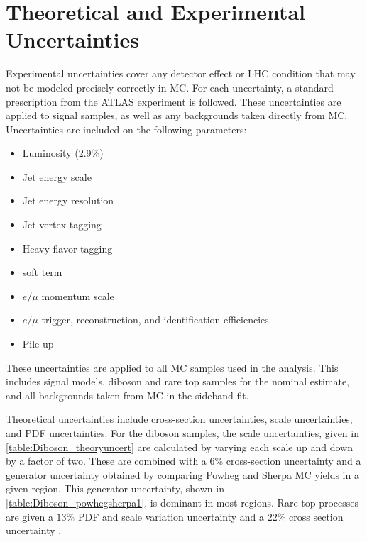 
\section{Theoretical and Experimental Uncertainties}

Experimental uncertainties cover any detector effect or \ac{LHC} condition that may not be modeled precisely correctly in \ac{MC}. For each uncertainty, a standard prescription from the \ac{ATLAS} experiment is followed. These uncertainties are applied to signal samples, as well as any backgrounds taken directly from \ac{MC}. Uncertainties are included on the following parameters:  
\begin{itemize}
\item Luminosity (2.9\%) \cite{2011lumi,2012lumi}
\item Jet energy scale \cite{ATL-PHYS-PUB-2015-015}
\item Jet energy resolution \cite{ATL-PHYS-PUB-2015-015}
\item Jet vertex tagging
\item Heavy flavor tagging
\item \met soft term \cite{ATL-PHYS-PUB-2015-023}
\item $e/\mu$ momentum scale  
\item $e/\mu$ trigger, reconstruction, and identification efficiencies
\item Pile-up
\end{itemize}

These uncertainties are applied to all \ac{MC} samples used in the analysis. This includes signal models, diboson and rare top samples for the nominal estimate, and all backgrounds taken from \ac{MC} in the sideband fit. 

Theoretical uncertainties include cross-section uncertainties, scale uncertainties, and \ac{PDF} uncertainties. For the diboson samples, the scale uncertainties, given in \autoref{table:Diboson_theoryuncert} are calculated by varying each scale up and down by a factor of two. These are combined with a 6\% cross-section uncertainty and a generator uncertainty obtained by comparing {\sc Powheg} and {\sc Sherpa} \ac{MC} yields in a given region. This generator uncertainty, shown in \autoref{table:Diboson_powhegsherpa1}, is dominant in most regions. Rare top processes are given a $13\%$ PDF and scale variation uncertainty \cite{Alwall:2014hca} and a $22\%$ cross section uncertainty \cite{Campbell:2012,Lazopoulos:2008,Garzelli:2012bn}. 

